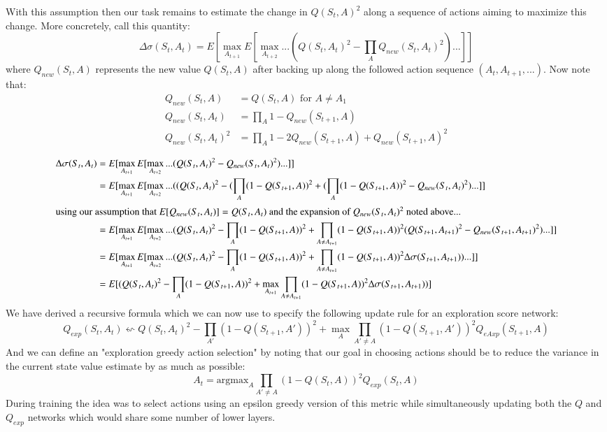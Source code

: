 \documentclass{article}
\begin{document}
With this assumption then our task remains to estimate the change in $Q(S_t,A)^2$ along a sequence of actions aiming to maximize this change. More concretely, call this quantity:
$$\Delta \sigma(S_t,A_t) = E[\max_{A_{t+1}}E[\max_{A_{t+2}}...(Q(S_t,A_t)^2-\prod_A Q_{new}(S_t,A_t)^2)...]]$$
where $Q_{new}(S_t,A)$ represents the new value $Q(S_t,A)$ after backing up along the followed action sequence $(A_t,A_{t+1},...)$. Now note that:
\begin{align*}
Q_{new}(S_t,A) &=Q(S_t,A) \text{ for } A\neq A_1\\
Q_{new}(S_t,A_t) &=\prod_A 1-Q_{new}(S_{t+1},A)\\
Q_{new}(S_t,A_t)^2&=\prod_A 1-2Q_{new}(S_{t+1},A)+Q_{new}(S_{t+1},A)^2\\
\end{align*}
\begin{align*}
\Delta \sigma(S_t,A_t) &= E[\max_{A_{t+1}}E[\max_{A_{t+2}}...( Q(S_t,A_t)^2- Q_{new}(S_t,A_t)^2)...]]\\
&=E[\max_{A_{t+1}}E[\max_{A_{t+2}}...((Q(S_t,A_t)^2-(\prod_{A} (1-Q(S_{t+1},A))^2+(\prod_{A} (1-Q(S_{t+1},A))^2-Q_{new}(S_t,A_t)^2)...]]\\
\intertext{using our assumption that $E[Q_{new}(S_t,A_t)]=Q(S_t,A_t)$ and the expansion of $Q_{new}(S_t,A_t)^2$ noted above... }
&=E[\max_{A_{t+1}}E[\max_{A_{t+2}}...(Q(S_t,A_t)^2-\prod_{A} (1-Q(S_{t+1},A))^2+\prod_{A\neq{A_{t+1}}} (1-Q(S_{t+1},A))^2(Q(S_{t+1},A_{t+1})^2-Q_{new}(S_{t+1},A_{t+1})^2)...]]\\
&=E[\max_{A_{t+1}}E[\max_{A_{t+2}}...(Q(S_t,A_t)^2-\prod_{A} (1-Q(S_{t+1},A))^2+\prod_{A\neq{A_{t+1}}} (1-Q(S_{t+1},A))^2\Delta \sigma(S_{t+1},A_{t+1}))...]]\\
&=E[(Q(S_t,A_t)^2-\prod_{A} (1-Q(S_{t+1},A))^2+\max_{A_{t+1}}\prod_{A\neq{A_{t+1}}} (1-Q(S_{t+1},A))^2\Delta \sigma(S_{t+1},A_{t+1}))]
\end{align*}
We have derived a recursive formula which we can now use to specify the following update rule for an exploration score network:
$$Q_{exp}(S_t,A_t)\leftsquigarrow Q(S_t,A_t)^2-\prod_{A'} (1-Q(S_{t+1},A'))^2+\max_A\prod_{A'\neq A} (1-Q(S_{t+1},A'))^2Q_{eAxp}(S_{t+1},A)$$
And we can define an "exploration greedy action selection" by noting that our goal in choosing actions should be to reduce the variance in the current state value estimate by as much as possible:
$$A_t= \text{argmax}_A\prod_{A'\neq A}(1-Q(S_t,A))^2Q_{exp}(S_t,A)$$
During training the idea was to select actions using an epsilon greedy version of this metric while simultaneously updating both the $Q$ and $Q_{exp}$ networks which would share some number of lower layers. 
\end{document}
